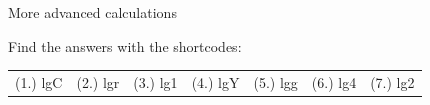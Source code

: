 \begin{exercises}{  More advanced calculations
      }
\begin{enumerate}[noitemsep, label=\textbf{\arabic*}. ]
\end{enumerate}
  \label{m38717**end}
\par {} Find the answers with the shortcodes:
 \par \begin{tabular}[h]{cccccc}
 (1.) lgC  &  (2.) lgr  &  (3.) lg1  &  (4.) lgY  &  (5.) lgg  &  (6.) lg4  &  (7.) lg2  & \end{tabular}
\end{exercises}
